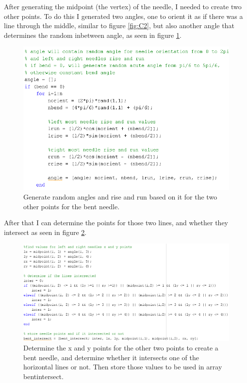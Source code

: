 \documentclass[11pt]{article}
\begin{document}
After generating the midpoint (the vertex) of the needle, I needed to create two other points. To do this I generated two angles, one to orient it as if there was a line through the middle, similar to figure \ref{fig:C2}, but also another angle that determines the random inbetween angle, as seen in figure \ref{fig:C6}.
\begin{figure}[H]
\begin{centering}
\includegraphics[scale=0.5]{f6.png}
\end{centering}
\caption{Generate random angles and rise and run based on it for the two other points for the bent needle.}
\label{fig:C6}
\end{figure}

After that I can determine the points for those two lines, and whether they intersect as seen in figure \ref{fig:C7}.
\begin{figure}[H]
\begin{centering}
\includegraphics[scale=0.5]{f7.png}
\end{centering}
\caption{Determine the x and y points for the other two points to create a bent needle, and determine whether it intersects one of the horizontal lines or not. Then store those values to be used in array bent\underline{\hspace{0.2cm}}intersect.}
\label{fig:C7}
\end{figure}
\end{document}
